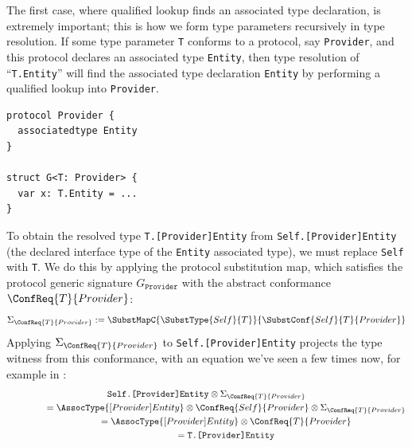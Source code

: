 \documentclass[../generics]{subfiles}
\begin{document}
The first case, where qualified lookup finds an associated type declaration, is extremely important; this is how we form type parameters recursively in type resolution. If some type parameter \texttt{T} conforms to a protocol, say \texttt{Provider}, and this protocol declares an associated type \texttt{Entity}, then type resolution of ``\texttt{T.Entity}'' will find the associated type declaration \texttt{Entity} by performing a qualified lookup into \texttt{Provider}.
\begin{Verbatim}
protocol Provider {
  associatedtype Entity
}

struct G<T: Provider> {
  var x: T.Entity = ...
}
\end{Verbatim}
To obtain the resolved type \texttt{T.[Provider]Entity} from \texttt{Self.[Provider]Entity} (the declared interface type of the \texttt{Entity} associated type), we must replace \texttt{Self} with \texttt{T}. We do this by applying the protocol substitution map, which satisfies the protocol generic signature $G_\texttt{Provider}$ with the abstract conformance $\ConfReq{T}{Provider}$: \[\Sigma_{\ConfReq{T}{Provider}}:=\SubstMapC{\SubstType{Self}{T}}{\SubstConf{Self}{T}{Provider}}\]
Applying $\Sigma_{\ConfReq{T}{Provider}}$ to \texttt{Self.[Provider]Entity} projects the type witness from this conformance, with an equation we've seen a few times now, for example in :
\begin{gather*}
\texttt{Self.[Provider]Entity}\otimes\Sigma_{\ConfReq{T}{Provider}}\\
\qquad\qquad{}=\AssocType{[Provider]Entity}\otimes\ConfReq{Self}{Provider}\otimes\Sigma_{\ConfReq{T}{Provider}}\\
\qquad\qquad{}=\AssocType{[Provider]Entity}\otimes\ConfReq{T}{Provider}\\
\qquad\qquad{}=\texttt{T.[Provider]Entity}
\end{gather*}
\end{document}
